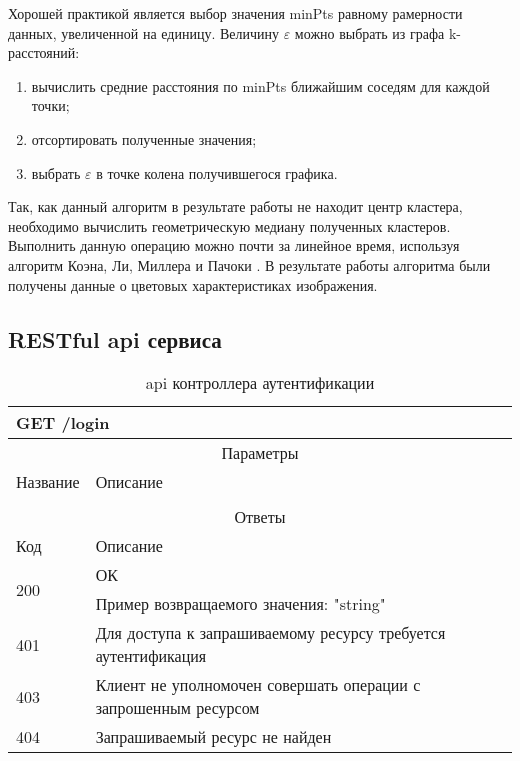 Хорошей практикой является выбор значения minPts равному рамерности данных, увеличенной на единицу.
Величину \(\mathcal{\varepsilon}\) можно выбрать из графа k-расстояний\cite{k-graph}:
\begin{enumerate}
    \item вычислить средние расстояния по minPts ближайшим соседям для каждой точки;
    \item отсортировать полученные значения;
    \item выбрать \(\mathcal{\varepsilon}\) в точке колена получившегося графика.
\end{enumerate}

Так, как данный алгоритм в результате работы не находит центр кластера, необходимо вычислить геометрическую медиану полученных кластеров.
Выполнить данную операцию можно почти за линейное время, используя алгоритм Коэна, Ли, Миллера и Пачоки \cite{median-linear}.
В результате работы алгоритма были получены данные о цветовых характеристиках изображения.

\subsection{RESTful api сервиса}

\begin{table}[H]
  \caption{api контроллера аутентификации}\label{use-case-15-table}
  \begin{tabular}{|p{6cm}|p{10cm}|}
  \hline \multicolumn{2}{|l|}{GET /login} \\
  \hline \multicolumn{2}{|c|}{Параметры} \\
  \hline Название & Описание \\
  \hline  &  \\
  \hline \multicolumn{2}{|c|}{Ответы} \\
  \hline Код & Описание \\
  \hline \multirow{2}{=}{200} & ОК \\
   & Пример возвращаемого значения: "string"\\
  \hline 401 & Для доступа к запрашиваемому ресурсу требуется аутентификация \\
  \hline 403 & Клиент не уполномочен совершать операции с запрошенным ресурсом \\
  \hline 404 & Запрашиваемый ресурс не найден \\
  \hline
  \end{tabular}
\end{table}

